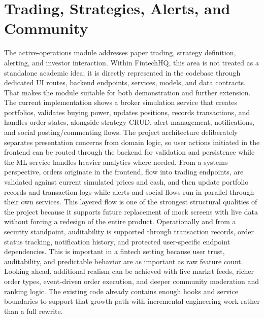 \documentclass[11pt,a4paper]{article}
\begin{document}
\section{Trading, Strategies, Alerts, and Community}
The active-operations module addresses paper trading, strategy definition, alerting, and investor interaction. Within FintechHQ, this area is not treated as a standalone academic idea; it is directly represented in the codebase through dedicated UI routes, backend endpoints, services, models, and data contracts. That makes the module suitable for both demonstration and further extension. The current implementation shows a broker simulation service that creates portfolios, validates buying power, updates positions, records transactions, and handles order states, alongside strategy CRUD, alert management, notifications, and social posting/commenting flows. The project architecture deliberately separates presentation concerns from domain logic, so user actions initiated in the frontend can be routed through the backend for validation and persistence while the ML service handles heavier analytics where needed. From a systems perspective, orders originate in the frontend, flow into trading endpoints, are validated against current simulated prices and cash, and then update portfolio records and transaction logs while alerts and social flows run in parallel through their own services. This layered flow is one of the strongest structural qualities of the project because it supports future replacement of mock screens with live data without forcing a redesign of the entire product. Operationally and from a security standpoint, auditability is supported through transaction records, order status tracking, notification history, and protected user-specific endpoint dependencies. This is important in a fintech setting because user trust, auditability, and predictable behavior are as important as raw feature count. Looking ahead, additional realism can be achieved with live market feeds, richer order types, event-driven order execution, and deeper community moderation and ranking logic. The existing code already contains enough hooks and service boundaries to support that growth path with incremental engineering work rather than a full rewrite.
\end{document}
